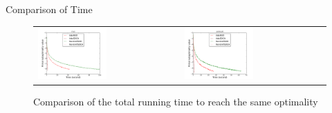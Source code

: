 \begin{frame}{Comparison of Time}
\begin{figure}[htbp]
\begin{tabular}{ll}
    \centering
        \includegraphics[width=0.5\textwidth]{images/comp_adas_time_rcv1.pdf} &
        \includegraphics[width=0.5\textwidth]{images/comp_adas_time_astro.pdf}
\end{tabular}
        \caption{Comparison of the total running time to reach the same optimality}
     \label{fig:adatime}
\end{figure}
\end{frame}

